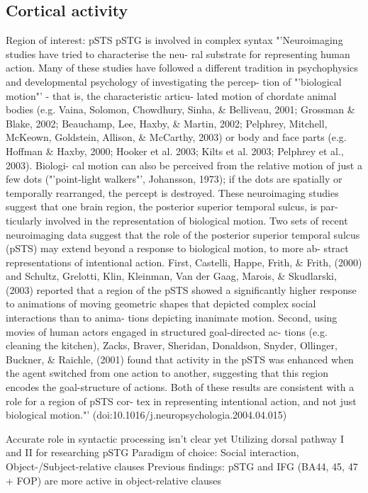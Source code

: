 \subsection{Cortical activity}
Region of interest: pSTS
pSTG is involved in complex syntax
"'Neuroimaging studies have tried to characterise the neu- ral substrate for representing human action. Many of these studies have followed a different tradition in psychophysics and developmental psychology of investigating the percep- tion of "'biological motion"' - that is, the characteristic articu- lated motion of chordate animal bodies (e.g. Vaina, Solomon, Chowdhury, Sinha, \& Belliveau, 2001; Grossman \& Blake, 2002; Beauchamp, Lee, Haxby, \& Martin, 2002; Pelphrey, Mitchell, McKeown, Goldstein, Allison, \& McCarthy, 2003) or body and face parts (e.g. Hoffman \& Haxby, 2000; Hooker et al. 2003; Kilts et al. 2003; Pelphrey et al., 2003). Biologi- cal motion can also be perceived from the relative motion of just a few dots ("'point-light walkers"', Johansson, 1973); if the dots are spatially or temporally rearranged, the percept is destroyed. These neuroimaging studies suggest that one brain region, the posterior superior temporal sulcus, is par- ticularly involved in the representation of biological motion.
Two sets of recent neuroimaging data suggest that the role of the posterior superior temporal sulcus (pSTS) may extend beyond a response to biological motion, to more ab- stract representations of intentional action. First, Castelli, Happe, Frith, \& Frith, (2000) and Schultz, Grelotti, Klin, Kleinman, Van der Gaag, Marois, \& Skudlarski, (2003) reported that a region of the pSTS showed a significantly higher response to animations of moving geometric shapes that depicted complex social interactions than to anima- tions depicting inanimate motion. Second, using movies of human actors engaged in structured goal-directed ac- tions (e.g. cleaning the kitchen), Zacks, Braver, Sheridan, Donaldson, Snyder, Ollinger, Buckner, \& Raichle, (2001) found that activity in the pSTS was enhanced when the agent switched from one action to another, suggesting that this region encodes the goal-structure of actions. Both of these results are consistent with a role for a region of pSTS cor- tex in representing intentional action, and not just biological motion."' (doi:10.1016/j.neuropsychologia.2004.04.015)

Accurate role in syntactic processing isn't clear yet
Utilizing dorsal pathway I and II for researching pSTG
Paradigm of choice: Social interaction, Object-/Subject-relative clauses
Previous findings: pSTG and IFG (BA44, 45, 47 + FOP) are more active in object-relative clauses


